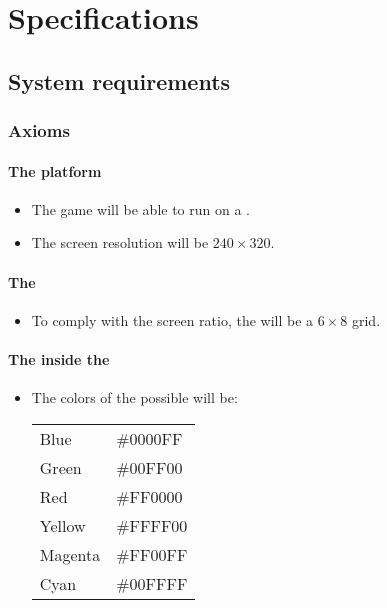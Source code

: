 \section{Specifications}

\subsection{System requirements}

\subsubsection{Axioms}

\paragraph{The platform}

\begin{itemize}
\item The game will be able to run on a \stmdb.
\item The screen resolution will be $240\times 320$.
\end{itemize}

\paragraph{The \grid}

\begin{itemize}

\item To comply with the screen ratio, the \grid will be a $6\times 8$ grid.

\end{itemize}

\paragraph{The \sqs inside the \grid}

\begin{itemize}
\item The colors of the possible \sqs will be:

\begin{tabular}{ll}

Blue    & \#0000FF \\
Green   & \#00FF00 \\
Red     & \#FF0000 \\
Yellow  & \#FFFF00 \\
Magenta & \#FF00FF \\
Cyan    & \#00FFFF \\

\end{tabular}
\end{itemize}

